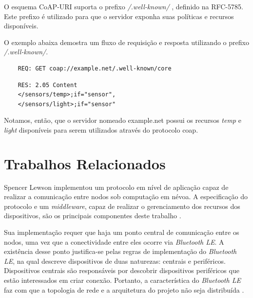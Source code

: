O esquema CoAP-URI suporta o prefixo \textit{/.well-known/} , definido na RFC-5785\cite{rfc5785}.
Este prefixo é utilizado para que o servidor exponha suas políticas e recursos disponíveis.

O exemplo abaixa demostra um fluxo de requisição e resposta utilizando o prefixo \textit{/.well-known/}.

\begin{verbatim}
    REQ: GET coap://example.net/.well-known/core
\end{verbatim}

\begin{verbatim}
    RES: 2.05 Content
    </sensors/temp>;if="sensor",
    </sensors/light>;if="sensor"
\end{verbatim}

Notamos, então, que o servidor nomeado example.net possui os recursos \textit{temp} e \textit{light} disponíveis para serem utilizados através do protocolo coap.

\section{Trabalhos Relacionados}


Spencer Lewson implementou um protocolo em nível de aplicação \cite{tanenbaum2011redes} capaz de realizar a comunicação entre nodos sob computação em névoa.
A especificação do protocolo e um \textit{middleware}, capaz de realizar o gerenciamento dos recursos dos dispositivos, são os principais componentes deste trabalho \cite{Spencer:2015}.

Sua implementação requer que haja um ponto central de comunicação entre os nodos, uma vez que a conectividade entre eles ocorre via \textit{Bluetooth LE}.
A existência desse ponto justifica-se pelas regras de implementação do \textit{Bluetooth LE}, na qual descreve dispositivos de duas naturezas: centrais e periféricos.
Dispositivos centrais são responsáveis por descobrir dispositivos periféricos que estão interessados em criar conexão.
Portanto, a característica do \textit{Bluetooth LE} faz com que a topologia de rede e a arquitetura do projeto não seja distribuída \cite{Spencer:2015}.





